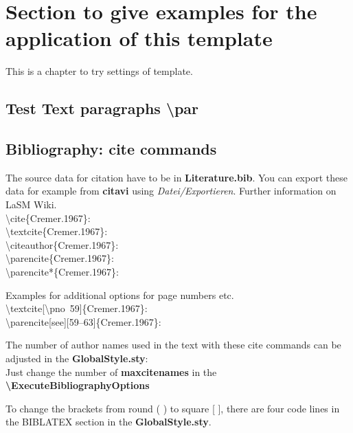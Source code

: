 \section[Section to try things] 	%
{Section to give examples for the application of this template} 	%
\label{lasmREADME} 		%
%
This is a chapter to try settings of template.
\subsection{Test Text paragraphs \textbackslash par}
%
\blindtext
\par
\blindtext
%
%
%
%
%
\subsection{Bibliography: cite commands}
%
The source data for citation have to be in \textbf{Literature.bib}.
You can export these data for example from \textbf{citavi} using \emph{Datei/Exportieren}.
Further information on LaSM Wiki.
\\
\textbackslash cite\{Cremer.1967\}: \cite{Cremer.1967}\\
\textbackslash textcite\{Cremer.1967\}: \textcite{Cremer.1967}\\
\textbackslash citeauthor\{Cremer.1967\}: \citeauthor{Cremer.1967}\\
\textbackslash parencite\{Cremer.1967\}: \parencite{Cremer.1967}\\
\textbackslash parencite*\{Cremer.1967\}: \parencite*{Cremer.1967}\\
\par
Examples for additional options for page numbers etc.\\
\textbackslash textcite[\textbackslash pno~59]\{Cremer.1967\}: \textcite[\pno~59]{Cremer.1967}\\
\textbackslash parencite[see][59--63]\{Cremer.1967\}: \parencite[see][59--63]{Cremer.1967}\\
\par
The number of author names used in the text with these cite commands can be adjusted in the \textbf{GlobalStyle.sty}:\\
Just change the number of \textbf{maxcitenames} in the \textbf{\textbackslash ExecuteBibliographyOptions}\\
\par
To change the brackets from round ( ) to square [ ], there are four code lines in the BIBLATEX section in the \textbf{GlobalStyle.sty}.
\par
\parencite{ISO162831:2014}
%
%
%
%
%
